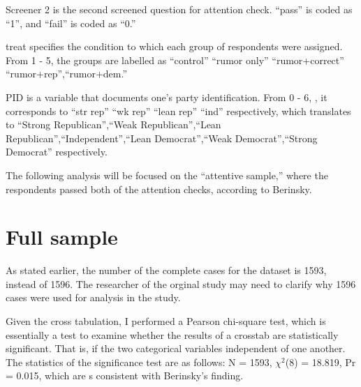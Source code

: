 \documentclass[AER]{AEA}
\begin{document}
Screener 2 is the second screened question for attention check. ``pass''
is coded as ``1'', and ``fail'' is coded as ``0.''

treat specifies the condition to which each group of respondents were
assigned. From 1 - 5, the groups are labelled as ``control'' ``rumor
only'' ``rumor+correct'' ``rumor+rep'',``rumor+dem.''

PID is a variable that documents one's party identification. From 0 - 6,
, it corresponds to ``str rep'' ``wk rep'' ``lean rep'' ``ind''
respectively, which translates to ``Strong Republican'',``Weak
Republican'',``Lean Republican'',``Independent'',``Lean
Democrat'',``Weak Democrat'',``Strong Democrat'' respectively.

The following analysis will be focused on the ``attentive sample,''
where the respondents passed both of the attention checks, according to
Berinsky.

\hypertarget{full-sample}{%
\section{Full sample}\label{full-sample}}

As stated earlier, the number of the complete cases for the dataset is
1593, instead of 1596. The researcher of the orginal study may need to
clarify why 1596 cases were used for analysis in the study.

\begin{table}

\caption{\label{tab:full sample}Treatment groups in the full sample}
\centering
{}
\end{table}

Given the cross tabulation, I performed a Pearson chi-square test, which
is essentially a test to examine whether the results of a crosstab are
statistically significant. That is, if the two categorical variables
independent of one another. The statistics of the significance test are
as follows: N = 1593, \(\chi^2\)(8) = 18.819, Pr = 0.015, which are s
consistent with Berinsky's finding.
\end{document}
